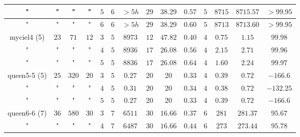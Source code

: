 \documentclass{beamer}
\begin{document}
{\begin{defi}
\begin{table}[H]
\begin{center}
\begin{tabular}{|c|c|c|c|c|c|c|c|c|c|c|c|c|c|}
\hline
{\small "} & {\small "} & {\small "} & {\small "} & {\small $5$} & {\small $6$} & {\small $>5h$} & {\small $29$}  & {\small $38.29$} & {\small $0.57$}  & {\small $5$} & {\small $8715$} & {\small $8715.57$}  & {\small $>99.95$}\\
\hline
{\small "} & {\small "} & {\small "} & {\small "} & {\small $6$} & {\small $6$} & {\small $>5h$} & {\small $29$}  & {\small $38.29$} & {\small $0.60$} & {\small $5$} & {\small $8713$} & {\small $8713.60$}  & {\small $>99.95$}\\
\hline
\hline
{\small myciel4 (5)} & {\small $23$} & {\small $71$} & {\small $12$} & {\small $3$} & {\small $5$} & {\small $8973$} & {\small $12$}  & {\small $47.82$} & {\small $0.40$} & {\small $4$} & {\small $0.75$} & {\small $1.15$}  & {\small $99.98$}\\
\hline
{\small "} & {\small "} & {\small "} & {\small "} & {\small $4$} & {\small $5$} & {\small $8936$} & {\small $17$}  & {\small $26.08$} & {\small $0.56$} & {\small $4$} & {\small $2.15$} & {\small $2.71$}  & {\small $99.96$}\\
\hline
{\small "} & {\small "} & {\small "} & {\small "} & {\small $5$} & {\small $5$} & {\small $8836$} & {\small $17$}  & {\small $26.08$} & {\small $0.64$} & {\small $4$} & {\small $1.60$} & {\small $2.24$}  & {\small $99.97$}\\
\hline
\hline
{\small queen5-5 (5)} & {\small $25$} & {\small $320$} & {\small $20$} & {\small $3$} & {\small $5$} & {\small $0.27$} & {\small $20$}  & {\small $20$} & {\small $0.33$} & {\small $4$} & {\small $0.39$} & {\small $0.72$}  & {\small $-166.6$}\\
\hline
{\small "} & {\small "} & {\small "} & {\small "} & {\small $4$} & {\small $5$} & {\small $0.31$} & {\small $20$}  & {\small $20$} & {\small $0.34$} & {\small $4$} & {\small $0.38$} & {\small $0.72$}  & {\small $-132.25$}\\
\hline
{\small "} & {\small "} & {\small "} & {\small "} & {\small $5$} & {\small $5$} & {\small $0.27$} & {\small $20$}  & {\small $20$} & {\small $0.33$} & {\small $4$} & {\small $0.39$} & {\small $0.72$}  & {\small $-166.6$}\\
\hline
\hline
{\small queen6-6 (7)} & {\small $36$} & {\small $580$} & {\small $30$} & {\small $3$} & {\small $7$} & {\small $6511$} & {\small $30$}  & {\small $16.66$} & {\small $0.37$} & {\small $6$} & {\small $281$} & {\small $281.37$} & {\small $95.67$}\\
\hline
{\small "} & {\small "} & {\small "} & {\small "} & {\small $4$} & {\small $7$} & {\small $6487$} & {\small $30$}  & {\small $16.66$} & {\small $0.44$} & {\small $6$} & {\small $273$} & {\small $273.44$} & {\small $95.78$}\\

\end{tabular}
\end{center}
\end{table}
\end{defi}}
\end{document}
